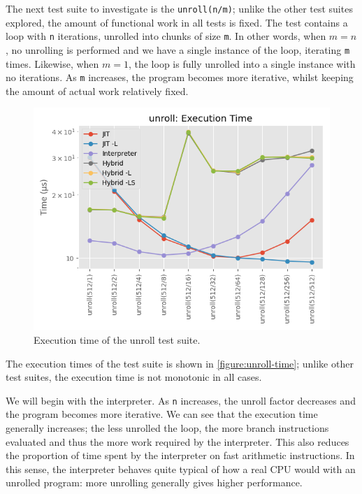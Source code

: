 The next test suite to investigate is the \texttt{unroll(n/m)}; unlike the other test suites explored, the amount of functional work in all tests is fixed. The test contains a loop with \texttt{n} iterations, unrolled into chunks of size \texttt{m}. In other words, when $m=n$, no unrolling is performed and we have a single instance of the loop, iterating \texttt{m} times. Likewise, when $m=1$, the loop is fully unrolled into a single instance with no iterations. As \texttt{m} increases, the program becomes more iterative, whilst keeping the amount of actual work relatively fixed.

\begin{figure}[H]
    \centering
    \includegraphics[scale=0.75]{output/graphs/tests/all/unroll/time.png}
    \caption{Execution time of the unroll test suite.}
    \label{figure:unroll-time}
\end{figure}

The execution times of the test suite is shown in \autoref{figure:unroll-time}; unlike other test suites, the execution time is not monotonic in all cases.

We will begin with the interpreter. As \texttt{n} increases, the unroll factor decreases and the program becomes more iterative. We can see that the execution time generally increases; the less unrolled the loop, the more branch instructions evaluated and thus the more work required by the interpreter. This also reduces the proportion of time spent by the interpreter on fast arithmetic instructions. In this sense, the interpreter behaves quite typical of how a real CPU would with an unrolled program: more unrolling generally gives higher performance.

